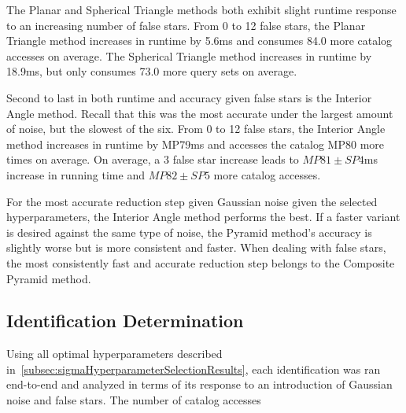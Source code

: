 The Planar and Spherical Triangle methods both exhibit slight runtime response to an increasing number of false
stars.
From 0 to 12 false stars, the Planar Triangle method increases in runtime by 5.6ms and consumes 84.0 more catalog
accesses on average.
The Spherical Triangle method increases in runtime by 18.9ms, but only consumes 73.0 more query sets on average.

Second to last in both runtime and accuracy given false stars is the Interior Angle method.
Recall that this was the most accurate under the largest amount of noise, but the slowest of the six.
From 0 to 12 false stars, the Interior Angle method increases in runtime by MP79ms and accesses the catalog MP80 more times
on average.
On average, a 3 false star increase leads to $MP81 \pm SP4$ms increase in running time and $MP82 \pm SP5$ more
catalog accesses.

For the most accurate reduction step given Gaussian noise given the selected hyperparameters, the Interior Angle method
performs the best.
If a faster variant is desired against the same type of noise, the Pyramid method's accuracy is slightly worse but
is more consistent and faster.
When dealing with false stars, the most consistently fast and accurate reduction step belongs to the Composite Pyramid
method.

\subsection{Identification Determination}\label{subsec:identificationDeterminationResults}
Using all optimal hyperparameters described in~\autoref{subsec:sigmaHyperparameterSelectionResults}, each identification
was ran end-to-end and analyzed in terms of its response to an introduction of Gaussian noise and false stars.
The number of catalog accesses

\begin{figure}
\end{figure}

